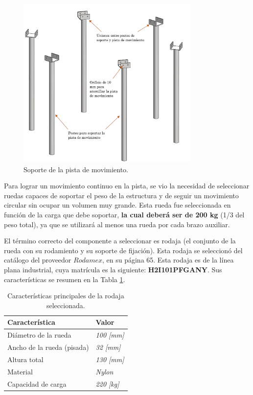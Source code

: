 \begin{figure}[H]
	\centering
	\includegraphics[width=9cm]{imagenes/rol1}
	\caption{Soporte de la pista de movimiento.}
	\label{fig:rol1}
\end{figure}

Para lograr un movimiento continuo en la pista, se vio la necesidad de seleccionar ruedas capaces de soportar el peso de la estructura y de seguir un movimiento circular sin ocupar un volumen muy grande. Esta rueda fue seleccionada en función de la carga que debe soportar, \textbf{la cual deberá ser de 200 kg} (1/3 del peso total), ya que se utilizará al menos una rueda por cada brazo auxiliar.

El término correcto del componente a seleccionar es rodaja (el conjunto de la rueda con su rodamiento y su soporte de fijación). Esta rodaja se seleccionó del catálogo \cite{DDEs6} del proveedor $ Rodamex $, en su página 65. Esta rodaja es de la línea plana industrial, cuya matrícula es la siguiente: \textbf{H2I101PFGANY}. Sus características se resumen en la Tabla \ref{tab:rodaja}.
\begin{table}[H]
  \centering
  \caption{Características principales de la rodaja seleccionada.}
    \begin{tabular}{|p{11.855em}|p{4.145em}|}
    \hline
    \textbf{Característica} & \textbf{Valor} \\
    \hline \hline
    Diámetro de la rueda & \textit{100 [mm]} \\
    \hline
    Ancho de la rueda (pisada) & \textit{32 [mm]} \\
    \hline
    Altura total & \textit{130 [mm]} \\
    \hline
    Material & \textit{Nylon} \\
    \hline
    Capacidad de carga & \textit{220 [kg]} \\
    \hline
    \end{tabular}%
  \label{tab:rodaja}%
\end{table}%

